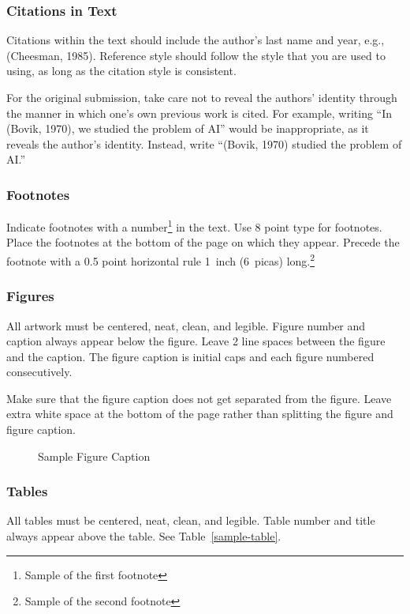 \subsubsection{Citations in Text}

Citations within the text should include the author's last name and
year, e.g., (Cheesman, 1985). Reference style should follow the style
that you are used to using, as long as the citation style is
consistent.

For the original submission, take care not to reveal the authors' identity through
the manner in which one's own previous work is cited.  For example, writing
``In (Bovik, 1970), we studied the problem of AI'' would be inappropriate, as
it reveals the author's identity.  Instead, write ``(Bovik, 1970) studied the
problem of AI.''

\subsubsection{Footnotes}

Indicate footnotes with a number\footnote{Sample of the first
footnote} in the text. Use 8 point type for footnotes.  Place the
footnotes at the bottom of the page on which they appear.  Precede the
footnote with a 0.5 point horizontal rule 1~inch (6~picas)
long.\footnote{Sample of the second footnote}

\subsubsection{Figures}

All artwork must be centered, neat, clean, and legible. Figure number
and caption always appear below the figure.  Leave 2 line spaces
between the figure and the caption. The figure caption is initial caps
and each figure numbered consecutively.

Make sure that the figure caption does not get separated from the
figure. Leave extra white space at the bottom of the page rather than
splitting the figure and figure caption.
\begin{figure}[h]
\vspace{1in}
\caption{Sample Figure Caption}
\end{figure}

\subsubsection{Tables}

All tables must be centered, neat, clean, and legible. Table number
and title always appear above the table.  See
Table~\ref{sample-table}.

